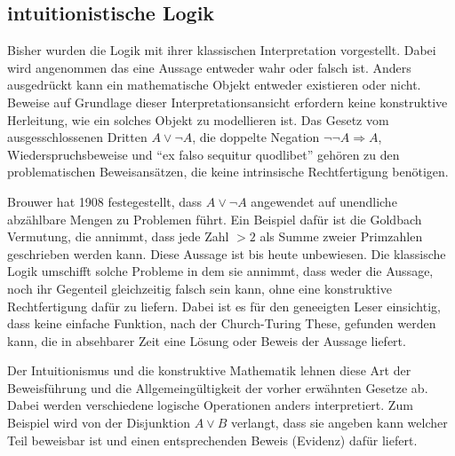 \subsection{intuitionistische Logik}
Bisher wurden die Logik mit ihrer klassischen Interpretation vorgestellt.
Dabei wird angenommen das eine Aussage entweder wahr oder falsch ist.
Anders ausgedrückt kann ein mathematische Objekt entweder existieren oder
nicht. Beweise auf Grundlage dieser Interpretationsansicht erfordern keine
konstruktive Herleitung, wie ein solches Objekt zu modellieren ist.
Das Gesetz vom ausgesschlossenen Dritten $A\vee\neg A$, die doppelte Negation $\neg\neg A\Rightarrow
A$, Wiederspruchsbeweise und "`ex falso sequitur quodlibet"' gehören zu den
problematischen Beweisansätzen, die keine intrinsische Rechtfertigung
benötigen.~\cite{sep-logic-intuitionistic}

Brouwer hat 1908 festegestellt, dass $A\vee\neg A$ angewendet auf unendliche
abzählbare Mengen zu Problemen führt. Ein Beispiel dafür ist die Goldbach
Vermutung, die annimmt, dass jede Zahl $> 2$ als Summe zweier Primzahlen
geschrieben werden kann. Diese Aussage ist bis heute unbewiesen. Die klassische
Logik umschifft solche Probleme in dem sie annimmt, dass weder die Aussage, noch 
ihr Gegenteil gleichzeitig falsch sein kann, ohne eine konstruktive
Rechtfertigung dafür zu liefern. Dabei ist es für den geneeigten Leser
einsichtig, dass keine einfache Funktion, nach der Church-Turing These, 
gefunden werden kann, die in absehbarer Zeit eine Lösung oder Beweis der
Aussage liefert.~\cite{sep-logic-intuitionistic, sep-mathematics-constructive}

Der Intuitionismus und die konstruktive Mathematik lehnen diese Art der
Beweisführung und die Allgemeingültigkeit der vorher erwähnten Gesetze ab.
Dabei werden verschiedene logische Operationen anders interpretiert.
Zum Beispiel wird von der Disjunktion $A\vee B$ verlangt, dass sie angeben kann
welcher Teil beweisbar ist und einen entsprechenden Beweis (Evidenz)
dafür liefert.~\cite{kreitz1994automatisierte}

